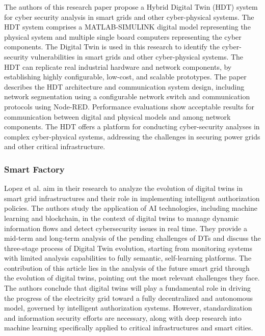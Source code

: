 The authors of this \cite{ayyalusamyHybridDigitalTwin2022a} research paper propose a Hybrid Digital Twin (HDT) system for cyber security analysis in smart grids and other cyber-physical systems. The HDT system comprises a MATLAB-SIMULINK digital model representing the physical system and multiple single board computers representing the cyber components. The Digital Twin is used in this research to identify the cyber-security vulnerabilities in smart grids and other cyber-physical systems. The HDT can replicate real industrial hardware and network components, by establishing highly configurable, low-cost, and scalable prototypes. The paper describes the HDT architecture and communication system design, including network segmentation using a configurable network switch and communication protocols using Node-RED. Performance evaluations show acceptable results for communication between digital and physical models and among network components. The HDT offers a platform for conducting cyber-security analyses in complex cyber-physical systems, addressing the challenges in securing power grids and other critical infrastructure.







\subsubsection*{Smart Factory}
Lopez et al.\cite{lopezDIGITALTWINSINTELLIGENT2021} aim in their research to analyze the evolution of digital twins in smart grid infrastructures and their role in implementing intelligent authorization policies. The authors study the application of AI technologies, including machine learning and blockchain, in the context of digital twins to manage dynamic information flows and detect cybersecurity issues in real time. They provide a mid-term and long-term analysis of the pending challenges of DTs and discuss the three-stage process of Digital Twin evolution, starting from monitoring systems with limited analysis capabilities to fully semantic, self-learning platforms. The contribution of this article lies in the analysis of the future smart grid through the evolution of digital twins, pointing out the most relevant challenges they face. The authors conclude that digital twins will play a fundamental role in driving the progress of the electricity grid toward a fully decentralized and autonomous model, governed by intelligent authorization systems. However, standardization and information security efforts are necessary, along with deep research into machine learning specifically applied to critical infrastructures and smart cities.


